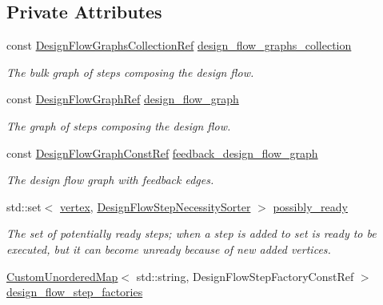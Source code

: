 \subsection*{Private Attributes}
\begin{DoxyCompactItemize}
\item 
const \hyperlink{design__flow__graph_8hpp_abb8645fa685dc5bd944be20162a6d174}{Design\+Flow\+Graphs\+Collection\+Ref} \hyperlink{classDesignFlowManager_af7a54cf43b76cd8da9a64e7e83fb93bd}{design\+\_\+flow\+\_\+graphs\+\_\+collection}
\begin{DoxyCompactList}\small\item\em The bulk graph of steps composing the design flow. \end{DoxyCompactList}\item 
const \hyperlink{design__flow__graph_8hpp_ab67393ecbbac075afaded9713a6cb39a}{Design\+Flow\+Graph\+Ref} \hyperlink{classDesignFlowManager_a2ecadf8326eac0ac1418595f1c312af2}{design\+\_\+flow\+\_\+graph}
\begin{DoxyCompactList}\small\item\em The graph of steps composing the design flow. \end{DoxyCompactList}\item 
const \hyperlink{design__flow__graph_8hpp_a0230319e566e6824d3d187b6871598f7}{Design\+Flow\+Graph\+Const\+Ref} \hyperlink{classDesignFlowManager_a733e1430234354a0e6c87e49f1967cf3}{feedback\+\_\+design\+\_\+flow\+\_\+graph}
\begin{DoxyCompactList}\small\item\em The design flow graph with feedback edges. \end{DoxyCompactList}\item 
std\+::set$<$ \hyperlink{graph_8hpp_abefdcf0544e601805af44eca032cca14}{vertex}, \hyperlink{classDesignFlowStepNecessitySorter}{Design\+Flow\+Step\+Necessity\+Sorter} $>$ \hyperlink{classDesignFlowManager_ac3a34b1fa14762e16309115e92a38fd9}{possibly\+\_\+ready}
\begin{DoxyCompactList}\small\item\em The set of potentially ready steps; when a step is added to set is ready to be executed, but it can become unready because of new added vertices. \end{DoxyCompactList}\item 
\hyperlink{custom__map_8hpp_ad1ed68f2ff093683ab1a33522b144adc}{Custom\+Unordered\+Map}$<$ std\+::string, Design\+Flow\+Step\+Factory\+Const\+Ref $>$ \hyperlink{classDesignFlowManager_a4e7a87bc3009946842d3c41a05f6ea6f}{design\+\_\+flow\+\_\+step\+\_\+factories}

\end{DoxyCompactItemize}
